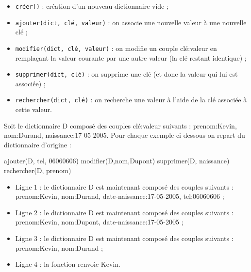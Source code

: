 \documentclass[
  a4paper,
  DIV=11,
  numbers=noendperiod]{scrartcl}
\newenvironment{Shaded}{\begin{snugshade}}{\end{snugshade}}
\newcommand{\DecValTok}[1]{\textcolor[rgb]{0.68,0.00,0.00}{#1}}
\newcommand{\ErrorTok}[1]{\textcolor[rgb]{0.68,0.00,0.00}{#1}}
\newcommand{\NormalTok}[1]{\textcolor[rgb]{0.00,0.23,0.31}{#1}}
\providecommand{\tightlist}{%
  \setlength{\itemsep}{0pt}\setlength{\parskip}{0pt}}\usepackage{longtable,booktabs,array}
\begin{document}
\begin{itemize}
\tightlist
\item
  \texttt{créer()} : création d'un nouveau dictionnaire vide ;
\item
  \texttt{ajouter(dict,\ clé,\ valeur)} : on associe une nouvelle valeur
  à une nouvelle clé ;
\item
  \texttt{modifier(dict,\ clé,\ valeur)} : on modifie un couple
  clé:valeur en remplaçant la valeur courante par une autre valeur (la
  clé restant identique) ;
\item
  \texttt{supprimer(dict,\ clé)} : on supprime une clé (et donc la
  valeur qui lui est associée) ;
\item
  \texttt{rechercher(dict,\ clé)} : on recherche une valeur à l'aide de
  la clé associée à cette valeur.
\end{itemize}

\begin{tcolorbox}[enhanced jigsaw, rightrule=.15mm, left=2mm, leftrule=.75mm, arc=.35mm, opacitybacktitle=0.6, colbacktitle=quarto-callout-caution-color!10!white, breakable, colback=white, toptitle=1mm, opacityback=0, toprule=.15mm, bottomrule=.15mm, title=\textcolor{quarto-callout-caution-color}{\faFire}\hspace{0.5em}{Exemple}, titlerule=0mm, bottomtitle=1mm, coltitle=black]

Soit le dictionnaire D composé des couples clé:valeur suivants :
prenom:Kevin, nom:Durand, naissance:17-05-2005. Pour chaque exemple
ci-dessous on repart du dictionnaire d'origine :

\begin{Shaded}
\begin{Highlighting}[numbers=left,,]
\NormalTok{ajouter(D, tel, }\DecValTok{0}\ErrorTok{6060606}\NormalTok{)}
\NormalTok{modifier(D,nom,Dupont)}
\NormalTok{supprimer(D, naissance)}
\NormalTok{rechercher(D, prenom)}
\end{Highlighting}
\end{Shaded}

\begin{itemize}
\tightlist
\item
  Ligne 1 : le dictionnaire D est maintenant composé des couples
  suivants : prenom:Kevin, nom:Durand, date-naissance:17-05-2005,
  tel:06060606 ;
\item
  Ligne 2 : le dictionnaire D est maintenant composé des couples
  suivants : prenom:Kevin, nom:Dupont, date-naissance:17-05-2005 ;
\item
  Ligne 3 : le dictionnaire D est maintenant composé des couples
  suivants : prenom:Kevin, nom:Durand ;
\item
  Ligne 4 : la fonction renvoie Kevin.
\end{itemize}

\end{tcolorbox}
\end{document}
